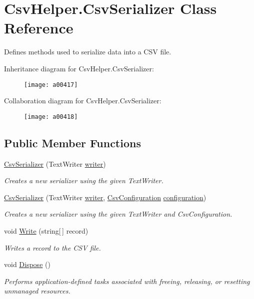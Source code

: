 \hypertarget{a00078}{\section{Csv\-Helper.\-Csv\-Serializer Class Reference}
\label{a00078}
}


Defines methods used to serialize data into a C\-S\-V file.  




Inheritance diagram for Csv\-Helper.\-Csv\-Serializer\-:
\nopagebreak
\begin{figure}[H]
\begin{center}
\leavevmode
\texttt{[image: a00417]}
\end{center}
\end{figure}


Collaboration diagram for Csv\-Helper.\-Csv\-Serializer\-:
\nopagebreak
\begin{figure}[H]
\begin{center}
\leavevmode
\texttt{[image: a00418]}
\end{center}
\end{figure}
\subsection*{Public Member Functions}
\begin{DoxyCompactItemize}
\item 
\hyperlink{a00078_a74ea10f7aaea0a478087d8ff6182f38c}{Csv\-Serializer} (Text\-Writer \hyperlink{a00078_adfb235fa2c868fc79c0376fd12fda767}{writer})
\begin{DoxyCompactList}\small\item\em Creates a new serializer using the given Text\-Writer. \end{DoxyCompactList}\item 
\hyperlink{a00078_ab14fe4a4f630ce97d57c27e2ee050fac}{Csv\-Serializer} (Text\-Writer \hyperlink{a00078_adfb235fa2c868fc79c0376fd12fda767}{writer}, \hyperlink{a00062}{Csv\-Configuration} \hyperlink{a00078_ae8c56ff97c0a797245f2205c486833ea}{configuration})
\begin{DoxyCompactList}\small\item\em Creates a new serializer using the given Text\-Writer and Csv\-Configuration. \end{DoxyCompactList}\item 
void \hyperlink{a00078_aefad906acd048863d3dd414651a44793}{Write} (string\mbox{[}$\,$\mbox{]} record)
\begin{DoxyCompactList}\small\item\em Writes a record to the C\-S\-V file. \end{DoxyCompactList}\item 
void \hyperlink{a00078_a9d0e8b3508b377a7f978da2394b09e36}{Dispose} ()
\begin{DoxyCompactList}\small\item\em Performs application-\/defined tasks associated with freeing, releasing, or resetting unmanaged resources. \end{DoxyCompactList}\end{DoxyCompactItemize}
